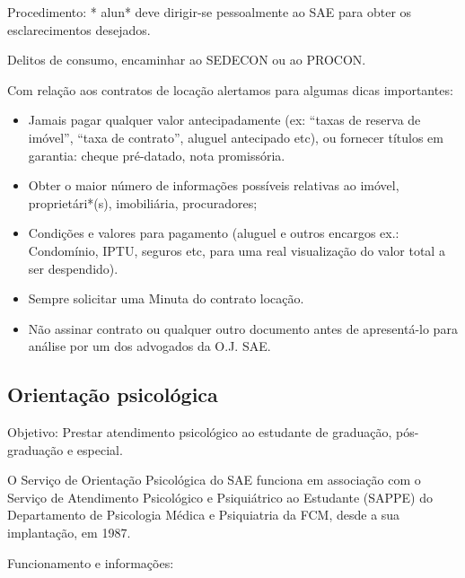 Procedimento: * alun* deve dirigir-se pessoalmente ao SAE para obter os
esclarecimentos desejados.

Delitos de consumo, encaminhar ao SEDECON ou ao PROCON.

Com relação aos contratos de locação alertamos para algumas dicas importantes:

\begin{itemize}
    \item  Jamais pagar qualquer valor antecipadamente (ex: ``taxas de reserva
        de imóvel'', ``taxa de contrato'', aluguel antecipado etc), ou fornecer
        títulos em garantia: cheque pré-datado, nota promissória.

    \item  Obter o maior número de informações possíveis relativas ao imóvel,
        proprietári*(s), imobiliária, procuradores;

    \item  Condições e valores para pagamento (aluguel e outros encargos ex.:
        Condomínio, IPTU, seguros etc, para uma real visualização do valor
        total a ser despendido).

    \item  Sempre solicitar uma Minuta do contrato locação.

    \item  Não assinar contrato ou qualquer outro documento antes de
        apresentá-lo para análise por um dos advogados da O.J. SAE.
\end{itemize}

\subsection{Orientação psicológica}

Objetivo: Prestar atendimento psicológico ao estudante de graduação,
pós-graduação e especial.

O Serviço de Orientação Psicológica do SAE funciona em associação com o Serviço
de Atendimento Psicológico e Psiquiátrico ao Estudante (SAPPE) do Departamento
de Psicologia Médica e Psiquiatria da FCM, desde a sua implantação, em 1987.

Funcionamento e informações:

